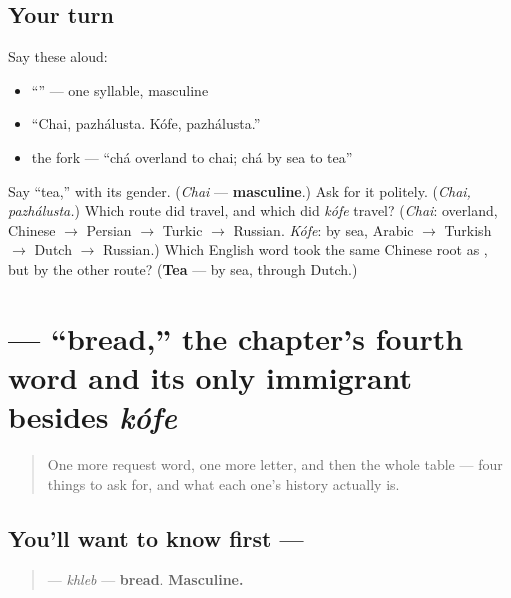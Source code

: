 \subsection*{Your turn}
Say these aloud:

\begin{itemize}
\raggedright
  \item \textquotedblleft{}\textquotedblright{} — one syllable, masculine
  \item \textquotedblleft{}Chai, pazhálusta. Kófe, pazhálusta.\textquotedblright{}
  \item the fork — \textquotedblleft{}chá overland to chai; chá by sea to tea\textquotedblright{}
\end{itemize}

\begin{tcolorbox}[breakable,colback=teal!4,colframe=teal!35!black,title={Before you move on}]
Say \textquotedblleft{}tea,\textquotedblright{} with its gender. (\emph{Chai} — \textbf{masculine}.) Ask for it politely. (\emph{Chai, pazhálusta.}) Which route did \emph{} travel, and which did \emph{kófe} travel? (\emph{Chai}: overland, Chinese $\to$ Persian $\to$ Turkic $\to$ Russian. \emph{Kófe}: by sea, Arabic $\to$ Turkish $\to$ Dutch $\to$ Russian.) Which English word took the same Chinese root as \emph{}, but by the other route? (\textbf{Tea} — by sea, through Dutch.)
\end{tcolorbox}
\section[\texorpdfstring{\ru{хлеб} (khleb)}{хлеб (khleb)}]{ — \textquotedblleft{}bread,\textquotedblright{} the chapter's fourth word and its only immigrant besides \emph{kófe}}

\label{lesson:RU-C06-khleb}



\begin{quote}
One more request word, one more letter, and then the whole table — four things to ask for, and what each one's history actually is.
\end{quote}

\subsection*{You'll want to know first — }
\begin{quote}
\textbf{} — \emph{khleb} — \textbf{bread}. \textbf{Masculine.}
\end{quote}

